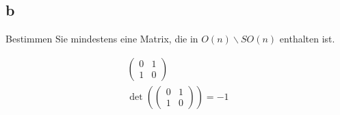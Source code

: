 \subsection{b}

Bestimmen Sie mindestens eine Matrix, die in $O(n) \backslash SO(n)$ enthalten
ist.

\begin{align*}
    \begin{pmatrix}
        0 & 1 \\
        1 & 0
    \end{pmatrix}                          \\
    \det\left(    \begin{pmatrix}
                      0 & 1 \\
                      1 & 0
                  \end{pmatrix}\right) = -1 \\
\end{align*}